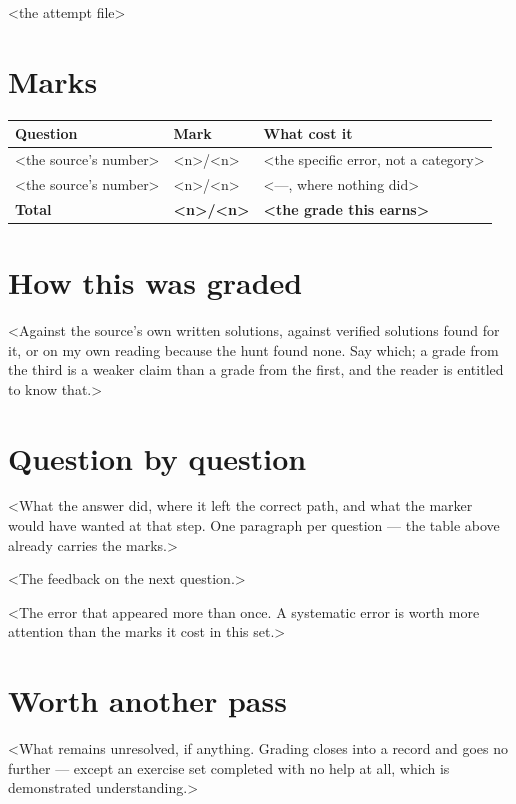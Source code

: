 \documentclass[a4paper,10pt]{article}
\begin{document}
%
  {<the attempt file>}

\section{Marks}
\noindent
\begin{tabular}{@{}llp{9.5cm}@{}}
\textbf{Question} & \textbf{Mark} & \textbf{What cost it} \\
\hline
<the source's number> & <n>/<n> & <the specific error, not a category> \\
<the source's number> & <n>/<n> & <---, where nothing did> \\
\hline
\textbf{Total} & \textbf{<n>/<n>} & \textbf{<the grade this earns>} \\
\end{tabular}

\section{How this was graded}
<Against the source's own written solutions, against verified solutions found for it, or on my own
reading because the hunt found none. Say which; a grade from the third is a weaker claim than a
grade from the first, and the reader is entitled to know that.>

\section{Question by question}

\begin{question}
<What the answer did, where it left the correct path, and what the marker would have wanted at
that step. One paragraph per question --- the table above already carries the marks.>
\end{question}

\begin{question}
<The feedback on the next question.>
\end{question}

\begin{warning}
<The error that appeared more than once. A systematic error is worth more attention than the
marks it cost in this set.>
\end{warning}

\section{Worth another pass}
<What remains unresolved, if anything. Grading closes into a record and goes no further --- except
an exercise set completed with no help at all, which is demonstrated understanding.>
\end{document}

